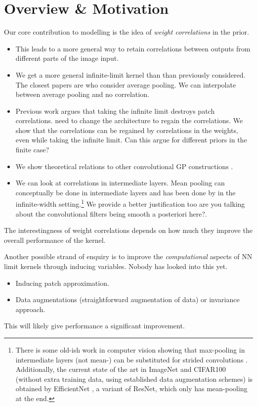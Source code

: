 \documentclass{article} %
\newcommand{\adrianote}[1]{{\color{blue}#1}}
\begin{document}
\section{Overview \& Motivation}
Our core contribution to modelling is the idea of \emph{weight correlations} in the prior.
\begin{itemize}
    \item This leads to a more general way to retain correlations between outputs from different parts of the image input.
    \item We get a more general infinite-limit kernel than than previously considered. The closest papers are \citet{arora2019exact,li2019enhanced,shankar2020} who consider average pooling. We can interpolate between average pooling and no correlation.
    \item Previous work argues that taking the infinite limit destroys patch correlations. \citet{arora2019exact,li2019enhanced,shankar2020} need to change the architecture to regain the correlations. We show that the correlations can be regained by correlations in the weights, even while taking the infinite limit. Can this argue for different priors in the finite case?
    \item We show theoretical relations to other convolutional GP constructions \citep{markvdw2017convolutional,dutordoir2019tick}.
    \item We can look at correlations in intermediate layers. Mean pooling can conceptually be done in intermediate layers and \adrianote{has been done by \citet{li19ecntk,shankar2020} in the infinite-width setting.}\footnote{There is some old-ish work in computer vision showing that max-pooling in intermediate layers (not mean-) can be substituted for strided convolutions \citep{springenberg14allconv}. Additionally, the current state of the art in ImageNet and CIFAR100  (without extra training data, using established data augmentation schemes) is obtained by EfficientNet \citep{tan19efficientnet}, a variant of ResNet, which only has mean-pooling at the end.} We provide a better justification too \adrianote{are you talking about the convolutional filters being smooth a posteriori here?}.
\end{itemize}
The interestingness of weight correlations depends on how much they improve the overall performance of the kernel.

Another possible strand of enquiry is to improve the \emph{computational} aspects of NN limit kernels through inducing variables. Nobody has looked into this yet.
\begin{itemize}
    \item Inducing patch approximation.
    \item Data augmentations (straightforward augmentation of data) or invariance approach.
\end{itemize}
This will likely give performance a significant improvement.
\end{document}
